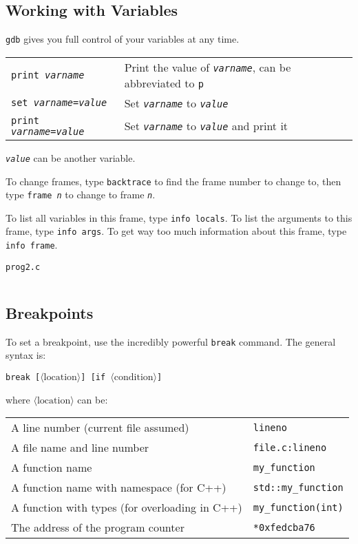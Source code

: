 \documentclass[11pt]{article}
\begin{document}
\subsection{Working with Variables}
\texttt{gdb} gives you full control of your variables at any time.

\begin{tabular}{l l}
    \texttt{print \emph{varname}} & Print the value of \texttt{\emph{varname}},
    can be abbreviated to \texttt{p} \\
    \texttt{set \emph{varname}=\emph{value}} & Set \texttt{\emph{varname}} to
    \texttt{\emph{value}} \\
    \texttt{print \emph{varname}=\emph{value}} & Set \texttt{\emph{varname}} to
    \texttt{\emph{value}} and print it \\
\end{tabular}

\texttt{\emph{value}} can be another variable.

To change frames, type \texttt{backtrace} to find the frame number to change
to, then type \texttt{frame \emph{n}} to change to frame \texttt{\emph{n}}.

To list all variables in this frame, type \texttt{info locals}. To list the
arguments to this frame, type \texttt{info args}. To get way too much
information about this frame, type \texttt{info frame}.

\begin{listingbox}[left=1cm]{\texttt{prog2.c}}
    \inputminted[linenos]{c}{prog2.c}
\end{listingbox}
\clearpage

\subsection{Breakpoints}
To set a breakpoint, use the incredibly powerful \texttt{break} command. The
general syntax is:
\begin{center}
    \texttt{break [$\langle \mathrm{location} \rangle$] [if $\langle
    \mathrm{condition} \rangle$]}
\end{center}
where $\langle \mathrm{location} \rangle$ can be:

\begin{tabular}{ l  l }
    A line number (current file assumed) & \texttt{lineno} \\
    A file name and line number & \texttt{file.c:lineno} \\
    A function name & \texttt{my\_function} \\
    A function name with namespace (for C++) & \texttt{std::my\_function} \\
    A function with types (for overloading in C++) & \texttt{my\_function(int)} \\
    The address of the program counter & \texttt{*0xfedcba76} \\
\end{tabular}
\end{document}
